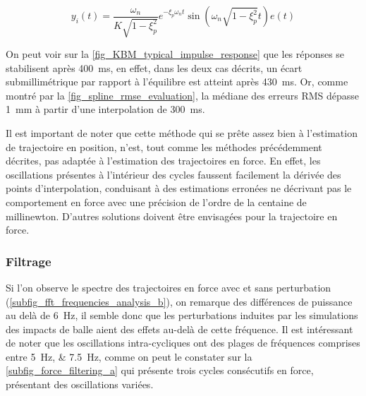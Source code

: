\begin{equation} \label{eq_2nd_order_impulse_response}
y_i(t) = \frac{\omega_n}{K\sqrt{1-\xi_p^2}}e^{-\xi_p\omega_nt}\sin(\omega_n\sqrt{1-\xi_p^2}t) e(t)
\end{equation}



On peut voir sur la \cref{fig_KBM_typical_impulse_response} que les réponses se stabilisent après \SI{400}{\milli\second}, en effet, dans les deux cas décrits, un écart submillimétrique par rapport à l'équilibre est atteint après \SI{430}{\milli\second}. %
Or, comme montré par la \cref{fig_spline_rmse_evaluation}, la médiane des erreurs RMS dépasse \SI{1}{\milli\meter} à partir d'une interpolation de \SI{300}{\milli\second}.

Il est important de noter que cette méthode qui se prête assez bien à l'estimation de trajectoire en position, n'est, tout comme les méthodes précédemment décrites, pas adaptée à l'estimation des trajectoires en force. En effet, les oscillations présentes à l'intérieur des cycles faussent facilement la dérivée des points d'interpolation, conduisant à des estimations erronées ne décrivant pas le comportement en force avec une précision de l'ordre de la centaine de millinewton. D'autres solutions doivent être envisagées pour la trajectoire en force.

\subsubsection{Filtrage} \label{chap3_sec_method_sub_virt_traj_4}

Si l'on observe le spectre des trajectoires en force avec et sans perturbation (\cref{subfig_fft_frequencies_analysis_b}), on remarque des différences de puissance au delà de \SI{6}{\hertz}, il semble donc que les perturbations induites par les simulations des impacts de balle aient des effets au-delà de cette fréquence. Il est intéressant de noter que les oscillations intra-cycliques ont des plages de fréquences comprises entre \SIlist{5;7.5}{\hertz}, comme on peut le constater sur la \cref{subfig_force_filtering_a} qui présente trois cycles consécutifs en force, présentant des oscillations variées.



